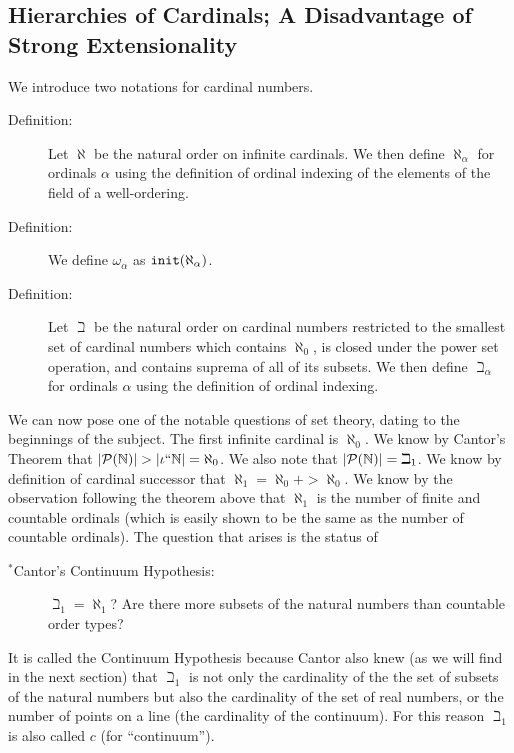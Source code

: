 \documentclass[12pt]{book}
\begin{document}
\newpage

\subsection{Hierarchies of Cardinals; A Disadvantage of Strong Extensionality}

We introduce two notations for cardinal numbers.  

\begin{description}

\item[Definition:] Let $\aleph$ be the natural order on infinite
cardinals.  We then define $\aleph_{\alpha}$ for ordinals $\alpha$
using the definition of ordinal indexing of the elements of the field
of a well-ordering.

\item[Definition:] We define $\omega_{\alpha}$ as ${\tt
init}(\aleph_{\alpha})$.

\item[Definition:] Let $\beth$ be the natural order on cardinal
numbers restricted to the smallest set of cardinal numbers which
contains $\aleph_0$, is closed under the power set operation, and
contains suprema of all of its subsets.  We then define
$\beth_{\alpha}$ for ordinals $\alpha$ using the definition of ordinal
indexing.

\end{description}

We can now pose one of the notable questions of set theory, dating to
the beginnings of the subject.  The first infinite cardinal is
$\aleph_0$.  We know by Cantor's Theorem that $|{\cal P}({\mathbb N})|
> |\iota``{\mathbb N}| = \aleph_0$.  We also note that $|{\cal
P}({\mathbb N})| = \beth_1$.  We know by definition of cardinal
successor that $\aleph_1 = \aleph_0+ > \aleph_0$.  We know by the
observation following the theorem above that $\aleph_1$ is the number
of finite and countable ordinals (which is easily shown to be the same
as the number of countable ordinals).  The question that arises is the
status of

\begin{description}

\item[$^*$Cantor's Continuum Hypothesis:] $\beth_1 = \aleph_1$?  Are
there more subsets of the natural numbers than countable order types?

\end{description}

It is called the Continuum Hypothesis because Cantor also knew (as we
will find in the next section) that $\beth_1$ is not only the
cardinality of the the set of subsets of the natural numbers but also
the cardinality of the set of real numbers, or the number of points on
a line (the cardinality of the continuum).  For this reason $\beth_1$
is also called $c$ (for ``continuum'').
\end{document}

